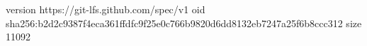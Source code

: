 version https://git-lfs.github.com/spec/v1
oid sha256:b2d2c9387f4eca361ffdfc9f25e0c766b9820d6dd8132eb7247a25f6b8ccc312
size 11092
